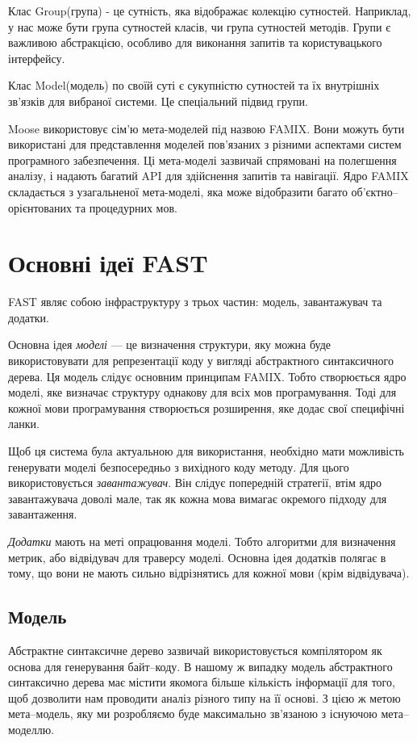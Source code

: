 \documentclass[12pt,a4paper]{article}
\begin{document}
Клас Group(група) - це сутність, яка відображає колекцію сутностей. Наприклад, у нас може бути група сутностей класів, чи група сутностей методів. Групи є важливою абстракцією, особливо для виконання запитів та користувацького інтерфейсу.

Клас Model(модель) по своїй суті є сукупністю сутностей та їх внутрішніх зв'язків для вибраної системи. Це спеціальний підвид групи.

Moose використовує сім'ю мета-моделей під назвою FAMIX. Вони можуть бути використані для представлення моделей пов'язаних з різними аспектами систем програмного забезпечення. Ці мета-моделі зазвичай спрямовані на полегшення аналізу,  і надають багатий API для здійснення запитів та навігації. Ядро FAMIX складається з узагальненої мета-моделі, яка може відобразити багато об'єктно--орієнтованих та процедурних мов. 

\clearpage

\section{Основні ідеї FAST}

FAST являє собою інфраструктуру з трьох частин: модель, завантажувач та додатки.

Основна ідея \emph{моделі} --- це визначення структури, яку можна буде використовувати для репрезентації коду у вигляді абстрактного синтаксичного дерева. Ця модель слідує основним принципам FAMIX. Тобто створюється ядро моделі, яке визначає структуру однакову для всіх мов програмування. Тоді для кожної мови програмування створюється розширення, яке додає свої специфічні ланки.

Щоб ця система була актуальною для використання, необхідно мати можливість генерувати моделі безпосередньо з вихідного коду методу. Для цього використовується \emph{завантажувач}. Він слідує попередній стратегії, втім ядро завантажувача доволі мале, так як кожна мова вимагає окремого підходу для завантаження.

\emph{Додатки} мають на меті опрацювання моделі. Тобто алгоритми для визначення метрик, або відвідувач для траверсу моделі. Основна ідея додатків полягає в тому, що вони не мають сильно відрізнятись для кожної мови (крім відвідувача).

\subsection{Модель}

Абстрактне синтаксичне дерево зазвичай використовується компілятором як основа для генерування байт--коду. В нашому ж випадку модель абстрактного синтаксично дерева має містити якомога більше кількість інформації для того, щоб дозволити нам проводити аналіз різного типу на її основі. З цією ж метою мета--модель, яку ми розробляємо буде максимально зв'язаною з існуючою мета--моделлю.
\end{document}
